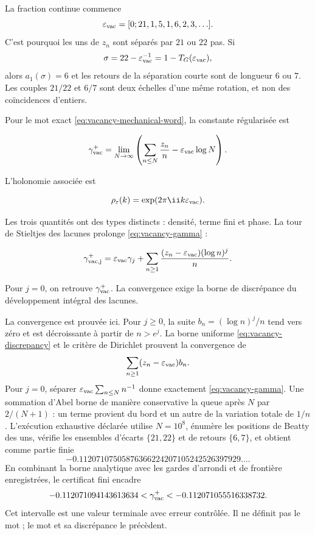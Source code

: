La fraction continue commence
\[
\varepsilon_{\rm vac}
=[0;21,1,5,1,6,2,3,\ldots].
\]
C'est pourquoi les uns de \(z_n\) sont séparés par \(21\) ou \(22\) pas.
Si
\[
\sigma=22-\varepsilon_{\rm vac}^{-1}
=1-T_G(\varepsilon_{\rm vac}),
\]
alors \(a_1(\sigma)=6\) et les retours de la séparation courte sont de
longueur \(6\) ou \(7\). Les couples \(21/22\) et \(6/7\) sont deux échelles d'une
même rotation, et non des coïncidences d'entiers.

Pour le mot exact \cref{eq:vacancy-mechanical-word}, la constante régularisée est

\begin{equation}
\gamma_{\rm vac}^{+}
=\lim_{N\to\infty}\left(
\sum_{n\le N}\frac{z_n}{n}
-\varepsilon_{\rm vac}\log N
\right).
\label{eq:vacancy-gamma}
\end{equation}

L'holonomie associée est

\begin{equation}
\rho_\varepsilon(k)=\exp(2\pi\ii k\varepsilon_{\rm vac}).
\label{eq:vacancy-holonomy}
\end{equation}

Les trois quantités ont des types distincts : densité, terme fini et phase. La tour de Stieltjes des lacunes prolonge \cref{eq:vacancy-gamma} :

\begin{equation}
\gamma_{\rm vac,j}^{+}
=\varepsilon_{\rm vac}\gamma_j
+\sum_{n\ge1}\frac{(z_n-\varepsilon_{\rm vac})(\log n)^j}{n}.
\label{eq:vacancy-stieltjes}
\end{equation}

Pour \(j=0\), on retrouve \(\gamma_{\rm vac}^{+}\). La convergence exige la borne de discrépance du développement intégral des lacunes.

La convergence est prouvée ici. Pour \(j\ge0\), la suite
\(b_n=(\log n)^j/n\) tend vers zéro et est décroissante à partir de
\(n>e^j\). La borne uniforme \cref{eq:vacancy-discrepancy} et le critère de
Dirichlet prouvent la convergence de
\[
\sum_{n\ge1}(z_n-\varepsilon_{\rm vac})b_n.
\]
Pour \(j=0\), séparer
\(\varepsilon_{\rm vac}\sum_{n\le N}n^{-1}\) donne exactement
\cref{eq:vacancy-gamma}. Une sommation d'Abel borne de manière conservative la
queue après \(N\) par \(2/(N+1)\) : un terme provient du bord et
un autre de la variation totale de \(1/n\). L'exécution exhaustive déclarée utilise
\(N=10^8\), énumère les positions de Beatty des uns, vérifie les
ensembles d'écarts \(\{21,22\}\) et de retours \(\{6,7\}\), et obtient comme
partie finie
\[
-0.11207107505876366224207105242526397929\ldots.
\]
En combinant la borne analytique avec les gardes d'arrondi et de frontière
enregistrées, le certificat fini encadre
\begin{equation}
-0.112071094143613634
<\gamma_{\rm vac}^{+}
<-0.112071055516338732.
\label{eq:vacancy-gamma-interval}
\end{equation}
Cet intervalle est une valeur terminale avec erreur contrôlée. Il ne définit pas le
mot ; le mot et sa discrépance le précèdent.

